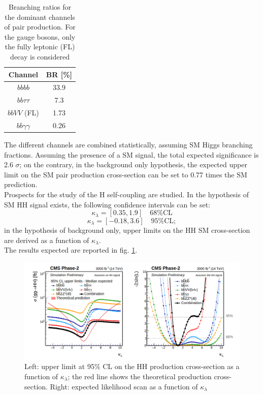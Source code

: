 \begin{table}[ht]
    \centering
    \begin{tabular}{c|c}
        Channel & BR [\%] \\\hline 
        $bbbb$ & 33.9 \\\hline
        $bb\tau\tau$ & 7.3 \\\hline
        $bbVV$ (FL) & 1.73 \\\hline
        $bb\gamma\gamma$ & 0.26 \\\hline
    \end{tabular}
    \caption{Branching ratios for the dominant channels of pair production. For the gauge bosons, only the fully leptonic (FL) decay is considered}
    \label{pair production BR}
\end{table}

The different channels are combined statistically, assuming SM Higgs branching fractions. Assuming the presence of a SM signal, the total expected significance is 2.6 $\sigma$; on the contrary, in the background only hypothesis, the expected upper limit on the SM pair production cross-section can be set to 0.77 times the SM prediction.\\
Prospects for the study of the H self-coupling are studied. In the hypothesis of SM HH signal exists, the following confidence intervals can be set:
\begin{equation}
    \kappa_{\lambda} = [0.35, 1.9] \quad 68 \% \text{CL}
\end{equation}
\begin{equation}
    \kappa_{\lambda} = [-0.18, 3.6] \quad 95 \% \text{CL};
\end{equation}
in the hypothesis of background only, upper limits on the HH SM cross-section are derived as a function of $\kappa_{\lambda}$.\\
The results expected are reported in fig. \ref{prospect_HH}.

\begin{figure}
    \centering
    \includegraphics[width =\linewidth]{images/prospects_HH.png}
    \caption{Left: upper limit at 95\% CL on the HH production cross-section as a function of $\kappa_{\lambda}$; the red line shows the theoretical production cross-section. Right: expected likelihood scan as a function of $\kappa_{\lambda}$}
    \label{prospect_HH}
\end{figure}
